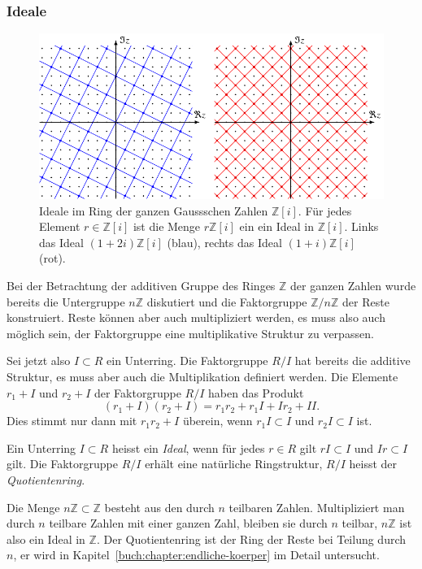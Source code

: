 \subsubsection{Ideale}
\begin{figure}
\centering
\includegraphics{chapters/10-vektorenmatrizen/images/ideale.pdf}
\caption{Ideale im Ring der ganzen Gaussschen Zahlen $\mathbb{Z}[i]$.
Für jedes Element $r\in \mathbb{Z}[i]$ ist die Menge  $r\mathbb{Z}[i]$
ein ein Ideal in $\mathbb{Z}[i]$.
Links das Ideal $(1+2i)\mathbb{Z}[i]$ (blau), rechts das Ideal
$(1+i)\mathbb{Z}[i]$ (rot).
\label{buch:vektorenmatrizen:fig:ideale}}
\end{figure}
Bei der Betrachtung der additiven Gruppe des Ringes $\mathbb{Z}$ der
ganzen Zahlen wurde bereits die Untergruppe $n\mathbb{Z}$ diskutiert
und die Faktorgruppe $\mathbb{Z}/n\mathbb{Z}$ der Reste konstruiert.
Reste können aber auch multipliziert werden, es muss also auch möglich
sein, der Faktorgruppe eine multiplikative Struktur zu verpassen.

Sei jetzt also $I\subset R$ ein Unterring.
Die Faktorgruppe $R/I$ hat bereits die additive Struktur, es muss
aber auch die Multiplikation definiert werden.
Die Elemente $r_1+I$ und $r_2+I$ der Faktorgruppe $R/I$ haben das
Produkt
\[
(r_1+I)(r_2+I)
=
r_1r_2 + r_1I + Ir_2 + II.
\]
Dies stimmt nur dann mit $r_1r_2+I$ überein, wenn $r_1I\subset I$ und
$r_2I\subset I$ ist.

\begin{definition}
Ein Unterring $I\subset R$ heisst ein {\em Ideal}, wenn für jedes $r\in R$ gilt
$rI\subset I$ und $Ir\subset I$ gilt.
%
Die Faktorgruppe $R/I$ erhält eine natürliche Ringstruktur, $R/I$ 
heisst der {\em Quotientenring}.
%
\end{definition}

\begin{beispiel}
Die Menge $n\mathbb{Z}\subset\mathbb{Z}$ besteht aus den durch $n$ teilbaren
Zahlen.
Multipliziert man durch $n$ teilbare Zahlen mit einer ganzen Zahl,
bleiben sie durch $n$ teilbar, $n\mathbb{Z}$ ist also ein Ideal in
$\mathbb{Z}$.
Der Quotientenring ist der Ring der Reste bei Teilung durch $n$,
er wird in 
Kapitel~\ref{buch:chapter:endliche-koerper}
im Detail untersucht.
\end{beispiel}

